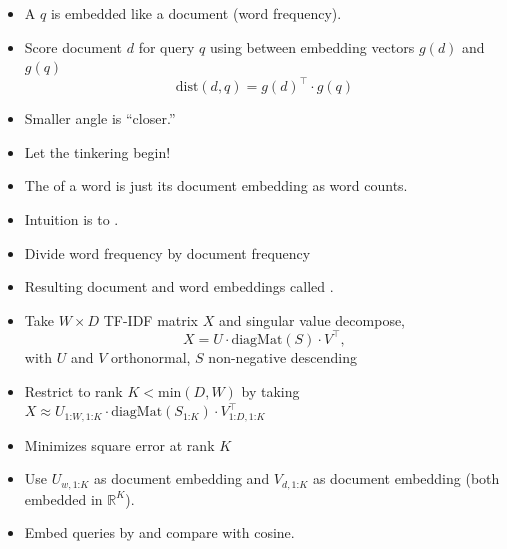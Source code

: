 \documentclass[10pt]{report}
\begin{document}
\begin{itemize}
\item A  $q$ is embedded like a document (word frequency).
\item Score document $d$ for query $q$ using 
  between embedding vectors $g(d)$ and $g(q)$
  $$
  \textrm{dist}(d, q) = g(d)^{\top} \cdot g(q)
  $$
\item Smaller angle is ``closer.''
\end{itemize}
\vfill
{}

\begin{itemize}
\item Let the tinkering begin!
  \vspace*{12pt}
\item The  of a word is just its document
  embedding as word counts.
\item Intuition is to .
\item Divide word frequency by document frequency
\item Resulting document and word embeddings called .
\end{itemize}
\vfill
{}

\begin{itemize}
\item Take $W \times D$ TF-IDF matrix $X$ and singular value decompose,
  $$
  X = U \cdot \textrm{diagMat}(S) \cdot V^{\top},
  $$
  with $U$ and $V$ orthonormal, $S$ non-negative descending
\item Restrict to rank $K < \textrm{min}(D, W)$ by taking
  $X \approx U_{1\textrm{:}W,1\textrm{:}K} \cdot \textrm{diagMat}(S_{1\textrm{:}K}) \cdot V_{1\textrm{:}D,
    1\textrm{:}K}^{\top}$
\item Minimizes square error at rank $K$
\item Use $U_{w,1\textrm{:}K}$ as document embedding and $V_{d,1\textrm{:}K}$ as
  document embedding (both embedded in $\mathbb{R}^K$).
\item Embed queries by  and compare with cosine. 
\end{itemize}
\vfill
{}
\end{document}
